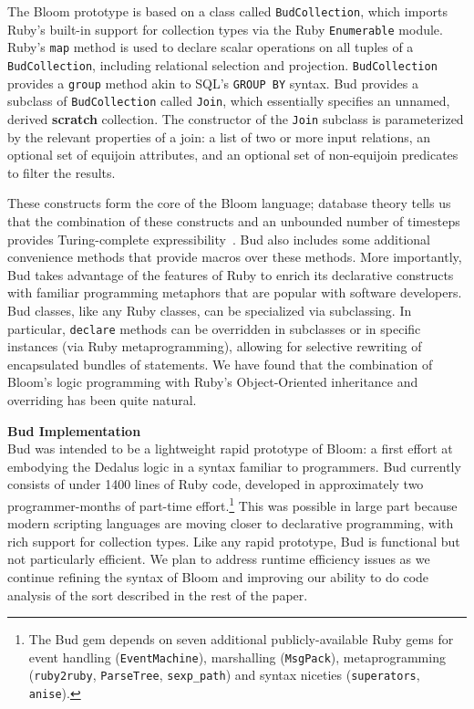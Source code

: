 The Bloom prototype is based on a class called \texttt{BudCollection}, which imports Ruby's built-in support for collection types via the Ruby {\tt Enumerable} module.  Ruby's {\tt map} method is used to declare scalar operations on all tuples of a \texttt{BudCollection}, including relational selection and projection.      \texttt{BudCollection} provides a {\tt group} method akin to SQL's {\tt GROUP BY} syntax.         Bud provides a subclass of \texttt{BudCollection} called {\tt Join}, which essentially specifies an unnamed, derived {\bf scratch} collection.  The constructor of the \texttt{Join} subclass is parameterized by the relevant properties of a join: a list of two or more input relations, an optional set of equijoin attributes, and an optional set of non-equijoin predicates to filter the results.  

These constructs form the core of the Bloom language; database theory tells us that the combination of these constructs and an unbounded number of timesteps provides Turing-complete expressibility~\cite{christospaper}.  Bud also includes some additional convenience methods that provide macros over these methods.  More importantly, Bud takes advantage of the features of Ruby to enrich its declarative constructs with familiar programming metaphors that are popular with software developers.  Bud classes, like any Ruby classes, can be specialized via subclassing.  In particular, {\tt declare} methods can be overridden in subclasses or in specific instances (via Ruby metaprogramming), allowing for selective rewriting of encapsulated bundles of statements.  We have found that the combination of Bloom's logic programming with Ruby's Object-Oriented inheritance and overriding has been quite natural.

{\bf Bud Implementation}\\
Bud was intended to be a lightweight rapid prototype of Bloom: a first effort at embodying the Dedalus logic in a syntax familiar to programmers.  Bud currently consists of under 1400 lines of Ruby code, developed in approximately two programmer-months of part-time effort.\footnote{The Bud gem depends on seven additional publicly-available Ruby gems for event handling ({\tt EventMachine}), marshalling ({\tt MsgPack}), metaprogramming ({\tt ruby2ruby}, {\tt ParseTree}, {\tt sexp\_path}) and syntax niceties ({\tt superators}, {\tt anise}).}  This was possible in large part because modern scripting languages are moving closer to declarative programming, with rich support for collection types.  Like any rapid prototype, Bud is functional but not particularly efficient.  We plan to address runtime efficiency issues as we continue refining the syntax of Bloom and improving our ability to do code analysis of the sort described in the rest of the paper.

